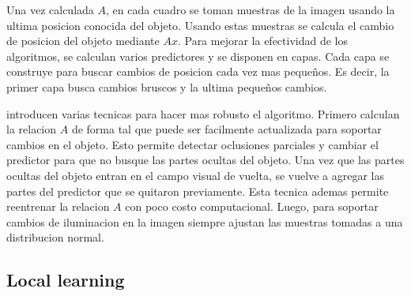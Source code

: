\documentclass[a4paper,10pt]{article}
\begin{document}
Una vez calculada $A$, en cada cuadro se toman muestras de la imagen usando la ultima posicion conocida del objeto.
Usando estas muestras se calcula el cambio de posicion del objeto mediante $Ax$.
Para mejorar la efectividad de los algoritmos, se calculan varios predictores y se disponen en capas.
Cada capa se construye para buscar cambios de posicion cada vez mas pequeños.
Es decir, la primer capa busca cambios bruscos y la ultima pequeños cambios.

\citeauthor*{alp} introducen varias tecnicas para hacer mas robusto el algoritmo.
Primero calculan la relacion $A$ de forma tal que puede ser facilmente actualizada para soportar cambios en el objeto.
Esto permite detectar oclusiones parciales y cambiar el predictor para que no busque las partes ocultas del objeto.
Una vez que las partes ocultas del objeto entran en el campo visual de vuelta, se vuelve a agregar las partes del predictor que se quitaron previamente.
Esta tecnica ademas permite reentrenar la relacion $A$ con poco costo computacional.
Luego, para soportar cambios de iluminacion en la imagen siempre ajustan las muestras tomadas a una distribucion normal.

\subsection{Local learning}
\end{document}
